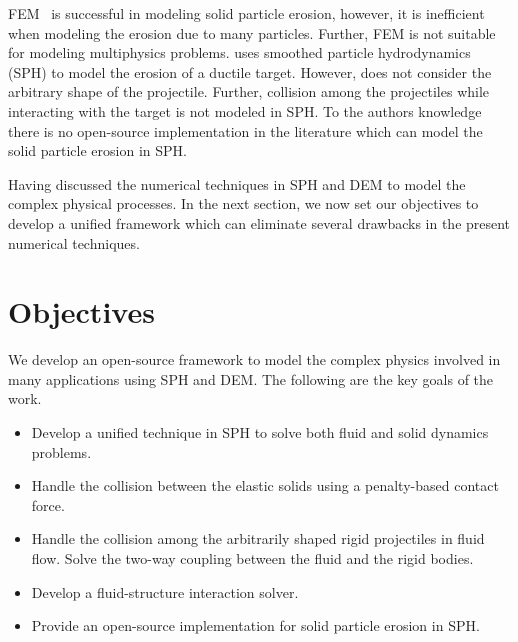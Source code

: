 FEM~\citep{takaffoli2009finite} is successful in modeling solid particle
erosion, however, it is inefficient when modeling the erosion due to many
particles. Further, FEM is not suitable for modeling multiphysics problems.
\cite{dong2016smoothed} uses smoothed particle hydrodynamics (SPH) to model the
erosion of a ductile target. However, \cite{dong2016smoothed} does not consider
the arbitrary shape of the projectile. Further, collision among the projectiles
while interacting with the target is not modeled in SPH. To the authors
knowledge there is no open-source implementation in the literature which can
model the solid particle erosion in SPH.

Having discussed the numerical techniques in SPH and DEM to model the complex
physical processes. In the next section, we now set our objectives to develop a
unified framework which can eliminate several drawbacks in the present numerical
techniques.

\section{Objectives}
We develop an open-source framework to model the complex physics involved in
many applications using SPH and DEM. The following are the key goals of the work.
\begin{itemize}
\item Develop a unified technique in SPH to solve both fluid and solid dynamics
  problems.
\item Handle the collision between the elastic solids using a penalty-based contact force.
\item Handle the collision among the arbitrarily shaped rigid projectiles in fluid
  flow. Solve the two-way coupling between the fluid and the rigid bodies.
\item Develop a fluid-structure interaction solver.
\item Provide an open-source implementation for solid particle erosion in SPH.
\end{itemize}

